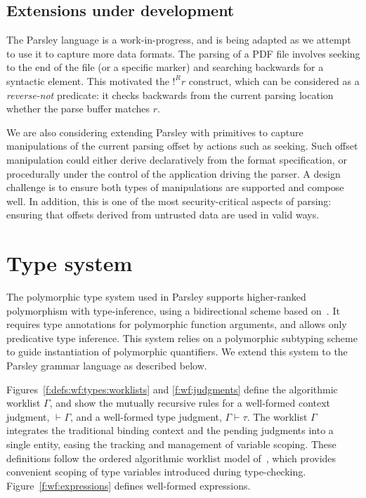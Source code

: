 \documentclass[letterpaper]{article}
\begin{document}
\subsection*{Extensions under development}

The Parsley language is a work-in-progress, and is being adapted as we
attempt to use it to capture more data formats.  The parsing of a PDF
file involves seeking to the end of the file (or a specific marker)
and searching backwards for a syntactic element.  This motivated the
$!^Rr$ construct, which can be considered as a \emph{reverse-not}
predicate: it checks backwards from the current parsing location
whether the parse buffer matches $r$.

We are also considering extending Parsley with primitives to capture
manipulations of the current parsing offset by actions such as
seeking.  Such offset manipulation could either derive declaratively
from the format specification, or procedurally under the control of
the application driving the parser.  A design challenge is to ensure
both types of manipulations are supported and compose well.  In
addition, this is one of the most security-critical aspects of
parsing: ensuring that offsets derived from untrusted data are used in
valid ways.

\section{Type system}
\label{s:typesys}

The polymorphic type system used in Parsley supports higher-ranked
polymorphism with type-inference, using a bidirectional scheme based
on~\cite{Dunfield13:bidir}.  It requires type annotations for
polymorphic function arguments, and allows only predicative type
inference.  This system relies on a polymorphic subtyping scheme
\cite{odersky96} to guide instantiation of polymorphic quantifiers.
We extend this system to the Parsley grammar language as described
below.

Figures~\ref{f:defs:wf:types:worklists} and \ref{f:wf:judgments}
define the algorithmic worklist $\Gamma$, and show the mutually
recursive rules for a well-formed context judgment, $\vdash\Gamma$,
and a well-formed type judgment, $\Gamma\vdash\tau$.  The worklist
$\Gamma$ integrates the traditional binding context and the pending
judgments into a single entity, easing the tracking and management of
variable scoping.  These definitions follow the ordered algorithmic
worklist model of~\cite{zhao2018,zhao19:bidir}, which provides
convenient scoping of type variables introduced during type-checking.
Figure~\ref{f:wf:expressions} defines well-formed expressions.
\end{document}
